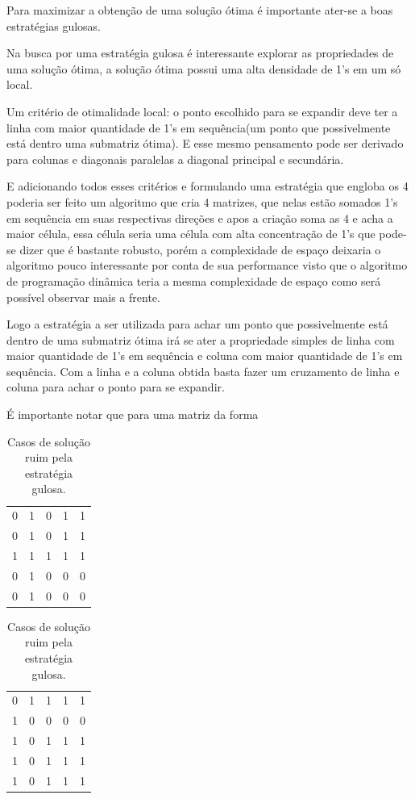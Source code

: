 \documentclass[10.9pt]{article}
\begin{document}
Para maximizar a obtenção de uma solução ótima é importante ater-se a boas estratégias gulosas.

Na busca por uma estratégia gulosa é interessante explorar as propriedades de uma solução ótima, a solução ótima possui uma alta densidade de 1's em um só local.

Um critério de otimalidade local: o ponto escolhido para se expandir deve ter a linha com maior quantidade de 1's em sequência(um ponto que possivelmente está dentro uma submatriz ótima). E esse mesmo pensamento pode ser derivado para colunas e diagonais paralelas a diagonal principal e secundária. 

E adicionando todos esses critérios e formulando uma estratégia que engloba os 4 poderia ser feito um algoritmo que cria 4 matrizes, que nelas estão somados 1's em sequência em suas respectivas direções e apos a criação soma as 4 e acha a maior célula, essa célula seria uma célula com alta concentração de 1's que pode-se dizer que é bastante robusto, porém a complexidade de espaço deixaria o algoritmo pouco interessante por conta de sua performance visto que o algoritmo de programação dinâmica teria a mesma complexidade de espaço como será possível observar mais a frente.

Logo a estratégia a ser utilizada para achar um ponto que possivelmente está dentro de uma submatriz ótima irá se ater a propriedade simples de linha com maior quantidade de 1's em sequência e coluna com maior quantidade de 1's em sequência. Com a linha e a coluna obtida basta fazer um cruzamento de linha e coluna para achar o ponto para se expandir.

É importante notar que para uma matriz da forma
\begin{table}[htbp]
\centering
\begin{tabular}{rrrrr}
0 & 1 & 0 & 1 & 1\\
0 & 1 & 0 & 1 & 1\\
1 & 1 & 1 & 1 & 1\\
0 & 1 & 0 & 0 & 0\\
0 & 1 & 0 & 0 & 0\\
\end{tabular}
\quad
\begin{tabular}{rrrrr}
0 & 1 & 1 & 1 & 1\\
1 & 0 & 0 & 0 & 0\\
1 & 0 & 1 & 1 & 1\\
1 & 0 & 1 & 1 & 1\\
1 & 0 & 1 & 1 & 1\\
\end{tabular}
\caption{Casos de solução ruim pela estratégia gulosa.}
\end{table}
\end{document}
